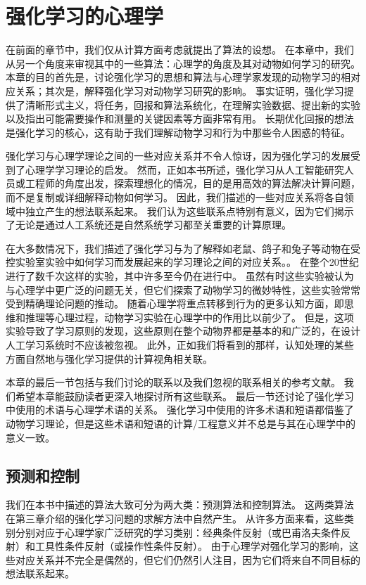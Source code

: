 

\chapter{强化学习的心理学} \label{chap:chap11}

在前面的章节中，我们仅从计算方面考虑就提出了算法的设想。
在本章中，我们从另一个角度来审视其中的一些算法：心理学的角度及其对动物如何学习的研究。
本章的目的首先是，讨论强化学习的思想和算法与心理学家发现的动物学习的相对应关系；其次是，解释强化学习对动物学习研究的影响。
事实证明，强化学习提供了清晰形式主义，将任务，回报和算法系统化，在理解实验数据、提出新的实验以及指出可能需要操作和测量的关键因素等方面非常有用。
长期优化回报的想法是强化学习的核心，这有助于我们理解动物学习和行为中那些令人困惑的特征。


强化学习与心理学理论之间的一些对应关系并不令人惊讶，因为强化学习的发展受到了心理学学习理论的启发。
然而，正如本书所述，强化学习从人工智能研究人员或工程师的角度出发，探索理想化的情况，目的是用高效的算法解决计算问题，而不是复制或详细解释动物如何学习。
因此，我们描述的一些对应关系将各自领域中独立产生的想法联系起来。
我们认为这些联系点特别有意义，因为它们揭示了无论是通过人工系统还是自然系统学习都至关重要的计算原理。


在大多数情况下，我们描述了强化学习与为了解释如老鼠、鸽子和兔子等动物在受控实验室实验中如何学习而发展起来的学习理论之间的对应关系。。
在整个20世纪进行了数千次这样的实验，其中许多至今仍在进行中。
虽然有时这些实验被认为与心理学中更广泛的问题无关，但它们探索了动物学习的微妙特性，这些实验常常受到精确理论问题的推动。
随着心理学将重点转移到行为的更多认知方面，即思维和推理等心理过程，动物学习实验在心理学中的作用比以前少了。
但是，这项实验导致了学习原则的发现，这些原则在整个动物界都是基本的和广泛的，在设计人工学习系统时不应该被忽视。
此外，正如我们将看到的那样，认知处理的某些方面自然地与强化学习提供的计算视角相关联。


本章的最后一节包括与我们讨论的联系以及我们忽视的联系相关的参考文献。
我们希望本章能鼓励读者更深入地探讨所有这些联系。
最后一节还讨论了强化学习中使用的术语与心理学术语的关系。
强化学习中使用的许多术语和短语都借鉴了动物学习理论，但是这些术语和短语的计算/工程意义并不总是与其在心理学中的意义一致。


\section{预测和控制}


我们在本书中描述的算法大致可分为两大类：预测算法和控制算法。
这两类算法在第三章介绍的强化学习问题的求解方法中自然产生。
从许多方面来看，这些类别分别对应于心理学家广泛研究的学习类别：经典条件反射（或巴甫洛夫条件反射）和工具性条件反射（或操作性条件反射）。
由于心理学对强化学习的影响，这些对应关系并不完全是偶然的，但它们仍然引人注目，因为它们将来自不同目标的想法联系起来。


